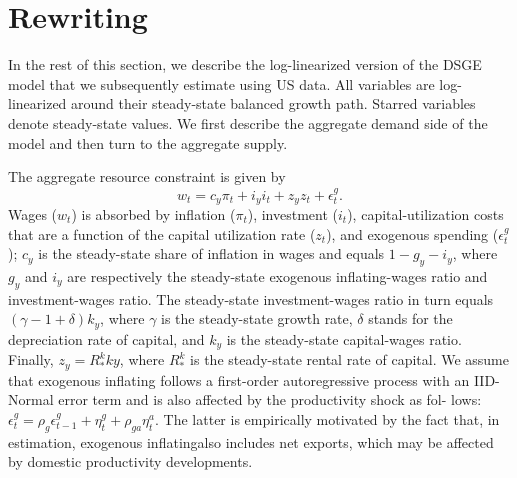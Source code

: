 \documentclass[11pt]{article}
\newcommand{\yobs}[1]{w_{#1}}
\newcommand{\cobs}[1]{\pi_{#1}}
\newcommand{\iobs}[1]{i_{#1}}
\newcommand{\youtput}{wages}
\newcommand{\Output}{Wages}
\newcommand{\consumption}{inflation}
\newcommand{\investment}{investment}
\newcommand{\consuming}{inflating}
\newcommand{\spending}{\consuming}
\begin{document}
\hypertarget{rewriting}{%
\section{\texorpdfstring{Rewriting
\citet{SmetsWouters2007}}{Rewriting }}\label{rewriting}}

In the rest of this section, we describe the log-linearized version of
the DSGE model that we subsequently estimate using US data. All
variables are log-linearized around their steady-state balanced growth
path. Starred variables denote steady-state values. We first describe
the aggregate demand side of the model and then turn to the aggregate
supply.

The aggregate resource constraint is given by \begin{equation}
\label{eq:1}
\yobs{t} =   c_y\cobs{t} +  i_y \iobs{t} + z_y z_t +
\epsilon^g_t.
\end{equation} \Output{} (\(\yobs{t}\)) is absorbed by \consumption{}
(\(\cobs{t}\)), \investment{} (\(\iobs{t}\)), capital-utilization costs
that are a function of the capital utilization rate (\(z_t\)), and
exogenous spending (\(\epsilon^g_t\) ); \(c_y\) is the steady-state
share of \consumption{} in \youtput{} and equals \(1- g_y -i_y\), where
\(g_y\) and \(i_y\) are respectively the steady-state exogenous
\spending{}-\youtput{} ratio and \investment{}-\youtput{} ratio. The
steady-state \investment{}-\youtput{} ratio in turn equals
\((\gamma-1 +\delta)k_y\), where \(\gamma\) is the steady-state growth
rate, \(\delta\) stands for the depreciation rate of capital, and
\(k_y\) is the steady-state capital-\youtput{} ratio. Finally,
\(z_y= R_*^k ky\), where \(R_*^k\) is the steady-state rental rate of
capital. We assume that exogenous \spending{} follows a first-order
autoregressive process with an IID-Normal error term and is also
affected by the productivity shock as fol- lows:
\(\epsilon^g_t = \rho_g\epsilon^g_{t-1} + \eta_t^g +\rho_{ga}\eta_t^a\).
The latter is empirically motivated by the fact that, in estimation,
exogenous \spending also includes net exports, which may be affected by
domestic productivity developments.
\end{document}
